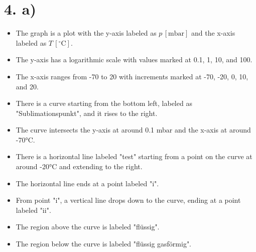 \section*{4. a)}

\begin{itemize}
    \item The graph is a plot with the y-axis labeled as \( p \, [\text{mbar}] \) and the x-axis labeled as \( T \, [^\circ \text{C}] \).
    \item The y-axis has a logarithmic scale with values marked at 0.1, 1, 10, and 100.
    \item The x-axis ranges from -70 to 20 with increments marked at -70, -20, 0, 10, and 20.
    \item There is a curve starting from the bottom left, labeled as "Sublimationspunkt", and it rises to the right.
    \item The curve intersects the y-axis at around 0.1 mbar and the x-axis at around -70°C.
    \item There is a horizontal line labeled "test" starting from a point on the curve at around -20°C and extending to the right.
    \item The horizontal line ends at a point labeled "i".
    \item From point "i", a vertical line drops down to the curve, ending at a point labeled "ii".
    \item The region above the curve is labeled "flüssig".
    \item The region below the curve is labeled "flüssig gasförmig".
\end{itemize}